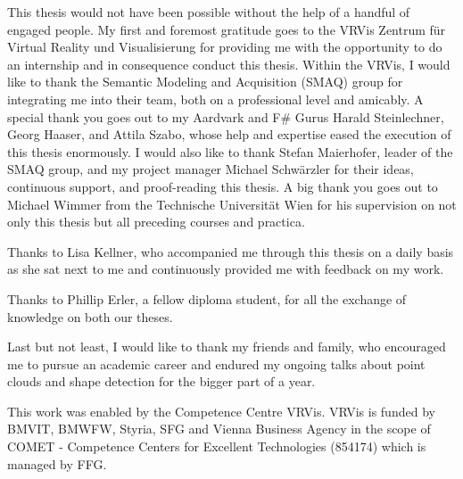 \documentclass[draft,final]{vutinfth} %
\begin{document}
\frontmatter %

\addstatementpage


\begin{acknowledgements*}

This thesis would not have been possible without the help of a handful of engaged people. 
My first and foremost gratitude goes to the VRVis Zentrum für Virtual Reality und Visualisierung for providing me with the opportunity to do an internship and in consequence conduct this thesis. Within the VRVis, I would like to thank the Semantic Modeling and Acquisition (SMAQ) group for integrating me into their team, both on a professional level and amicably. A special thank you goes out to my Aardvark and F\# Gurus Harald Steinlechner, Georg Haaser, and Attila Szabo, whose help and expertise eased the execution of this thesis enormously. 
I would also like to thank Stefan Maierhofer, leader of the SMAQ group, and my project manager Michael Schwärzler for their ideas, continuous support, and proof-reading this thesis. 
A big thank you goes out to Michael Wimmer from the Technische Universität Wien for his supervision on not only this thesis but all preceding courses and practica. 

Thanks to Lisa Kellner, who accompanied me through this thesis on a daily basis as she sat next to me and continuously provided me with feedback on my work. 

Thanks to Phillip Erler, a fellow diploma student, for all the exchange of knowledge on both our theses. 

Last but not least, I would like to thank my friends and family, who encouraged me to pursue an academic career and endured my ongoing talks about point clouds and shape detection for the bigger part of a year.

This work was enabled by the Competence Centre VRVis. VRVis is funded by BMVIT, BMWFW, Styria, SFG and Vienna Business Agency in the scope of COMET - Competence Centers for Excellent Technologies (854174) which is managed by FFG.

\end{acknowledgements*}
\end{document}
